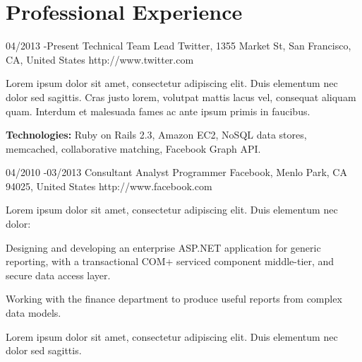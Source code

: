 \documentclass[10pt]{article} %
\begin{document}
\section*{Professional Experience}

\begin{job}
  {04/2013 -}{Present}
  {Technical Team Lead}
  {Twitter, 1355 Market St, San Francisco, CA, United States}
  {http://www.twitter.com}
  {Lorem ipsum dolor sit amet, consectetur adipiscing elit. Duis elementum nec dolor sed sagittis. Cras justo lorem, volutpat mattis lacus vel, consequat aliquam quam. Interdum et malesuada fames ac ante ipsum primis in faucibus.\\
    \rule{0mm}{5mm}\textbf{Technologies:} Ruby on Rails 2.3, Amazon EC2, NoSQL data stores, memcached, collaborative matching, Facebook Graph API.}
\end{job}


\begin{job}
  {04/2010 -}{03/2013}
  {Consultant Analyst Programmer}
  {Facebook, Menlo Park, CA 94025, United States}
  {http://www.facebook.com}
  {Lorem ipsum dolor sit amet, consectetur adipiscing elit. Duis elementum nec dolor:

    \begin{itemize-noindent}
    \item{Designing and developing an enterprise ASP.NET application for generic reporting, with a transactional COM+ serviced component middle-tier, and secure data access layer.}
    \item{Working with the finance department to produce useful reports from complex data models.}
    \end{itemize-noindent}

    Lorem ipsum dolor sit amet, consectetur adipiscing elit. Duis elementum nec dolor sed sagittis.}
\end{job}
\end{document}
